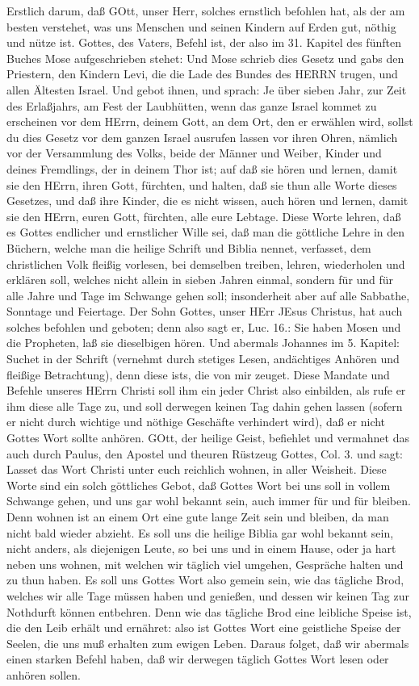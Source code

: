 Erstlich darum, daß GOtt, unser Herr, solches ernstlich befohlen hat, als der am besten verstehet, was uns Menschen und seinen Kindern auf Erden gut, nöthig und nütze ist. Gottes, des Vaters, Befehl ist, der also im 31. Kapitel des fünften Buches Mose aufgeschrieben stehet: Und Mose schrieb dies Gesetz und gabs den Priestern, den Kindern Levi, die die Lade des Bundes des HERRN trugen, und allen Ältesten Israel. Und gebot ihnen, und sprach: Je über sieben Jahr, zur Zeit des Erlaßjahrs, am Fest der Laubhütten, wenn das ganze Israel kommet zu erscheinen vor dem HErrn, deinem Gott, an dem Ort, den er erwählen wird, sollst du dies Gesetz vor dem ganzen Israel ausrufen lassen vor ihren Ohren, nämlich vor der Versammlung des Volks, beide der Männer und Weiber, Kinder und deines Fremdlings, der in deinem Thor ist; auf daß sie hören und lernen, damit sie den HErrn, ihren Gott, fürchten, und halten, daß sie thun alle Worte dieses Gesetzes, und daß ihre Kinder, die es nicht wissen, auch hören und lernen, damit sie den HErrn, euren Gott, fürchten, alle eure Lebtage. Diese Worte lehren, daß es Gottes endlicher und ernstlicher Wille sei, daß man die göttliche Lehre in den Büchern, welche man die heilige Schrift und Biblia nennet, verfasset, dem christlichen Volk fleißig vorlesen, bei demselben treiben, lehren, wiederholen und erklären soll, welches nicht allein in sieben Jahren einmal, sondern für und für alle Jahre und Tage im Schwange gehen soll; insonderheit aber auf alle Sabbathe, Sonntage und Feiertage. Der Sohn Gottes, unser HErr JEsus Christus, hat auch solches befohlen und geboten; denn also sagt er, Luc. 16.: Sie haben Mosen und die Propheten, laß sie dieselbigen hören. Und abermals Johannes im 5. Kapitel: Suchet in der Schrift (vernehmt durch stetiges Lesen, andächtiges Anhören und fleißige Betrachtung), denn diese ists, die von mir zeuget. Diese Mandate und Befehle unseres HErrn Christi soll ihm ein jeder Christ also einbilden, als rufe er ihm diese alle Tage zu, und soll derwegen keinen Tag dahin gehen lassen (sofern er nicht durch wichtige und nöthige Geschäfte verhindert wird), daß er nicht Gottes Wort sollte anhören. GOtt, der heilige Geist, befiehlet und vermahnet das auch durch Paulus, den Apostel und theuren Rüstzeug Gottes, Col. 3. und sagt: Lasset das Wort Christi unter euch reichlich wohnen, in aller Weisheit. Diese Worte sind ein solch göttliches Gebot, daß Gottes Wort bei uns soll in vollem Schwange gehen, und uns gar wohl bekannt sein, auch immer für und für bleiben. Denn wohnen ist an einem Ort eine gute lange Zeit sein und bleiben, da man nicht bald wieder abzieht. Es soll uns die heilige Biblia gar wohl bekannt sein, nicht anders, als diejenigen Leute, so bei uns und in einem Hause, oder ja hart neben uns wohnen, mit welchen wir täglich viel umgehen, Gespräche halten und zu thun haben. Es soll uns Gottes Wort also gemein sein, wie das tägliche Brod, welches wir alle Tage müssen haben und genießen, und dessen wir keinen Tag zur Nothdurft können entbehren. Denn wie das tägliche Brod eine leibliche Speise ist, die den Leib erhält und ernähret: also ist Gottes Wort eine geistliche Speise der Seelen, die uns muß erhalten zum ewigen Leben. Daraus folget, daß wir abermals einen starken Befehl haben, daß wir derwegen täglich Gottes Wort lesen oder anhören sollen.

